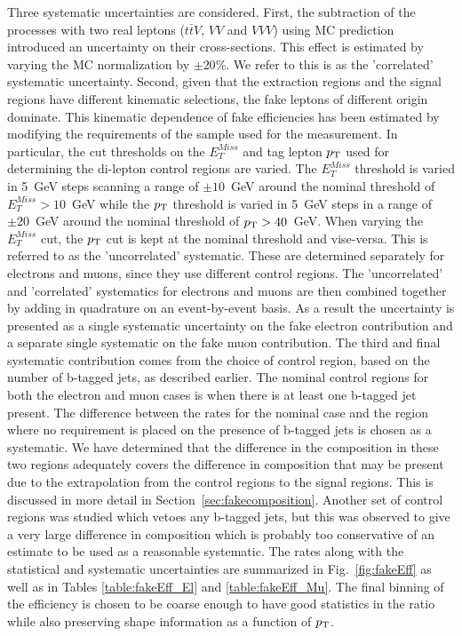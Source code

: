Three systematic uncertainties are considered. First, the subtraction of the processes with 
two real leptons ($t\bar{t}V$, $VV$ and $VVV$) using MC prediction introduced an uncertainty on 
their cross-sections. This effect is estimated by varying the MC normalization by $\pm 20$\%.  %
We refer to this is as the 'correlated' systematic uncertainty.
Second, given that the extraction regions and the signal regions have different kinematic selections, 
the fake leptons of different origin dominate. This kinematic dependence of fake efficiencies has been estimated 
by modifying the requirements of the sample used for the measurement. In particular, the cut thresholds 
on the $E_{T}^{Miss}$ and tag lepton $p_{\mathrm{T}}$ used
for determining the di-lepton control regions are varied. The $E_{T}^{Miss}$ threshold is 
varied in 5~GeV steps scanning a range of $\pm 10$~GeV around the nominal
threshold of $E_{T}^{Miss} > 10$~GeV while the $p_{\mathrm{T}}$ threshold is varied in 5~GeV steps in a range of $\pm 20$~GeV 
around the nominal threshold of $p_{\mathrm{T}} > 40$~GeV.  When varying the $E_{T}^{Miss}$ cut, the $p_{\mathrm{T}}$ cut
is kept at the nominal threshold and vise-versa. This is referred to as the 'uncorrelated' systematic.
These are determined separately for electrons and muons, since they use different control regions. The 'uncorrelated' and
'correlated' systematics for electrons and muons are then combined together by adding in quadrature on an event-by-event basis.
As a result the uncertainty is presented as a single systematic uncertainty on the fake electron
contribution and a separate single systematic on the fake muon contribution.
The third and final systematic contribution comes from the choice of control region, based on the number of b-tagged
jets, as described earlier.  The nominal control regions for both the electron and muon cases is when 
there is at least one b-tagged jet present.  The difference between the rates for the nominal case
and the region where no requirement is placed on the presence of b-tagged jets is chosen as a systematic.
We have determined that the difference in the composition in these two regions adequately covers the difference
in composition that may be present due to the extrapolation from the control regions to the signal regions. This is 
discussed in more detail in Section~\ref{sec:fakecomposition}.  Another set of control regions was studied
which vetoes any b-tagged jets, but this was observed to give a very large difference in composition which is 
probably too conservative of an estimate to be used as a reasonable systematic.
The rates along with the statistical and systematic uncertainties are summarized in Fig.~\ref{fig:fakeEff} 
as well as in Tables \ref{table:fakeEff_El} and \ref{table:fakeEff_Mu}.
The final binning of the efficiency is chosen to be coarse enough
to have good statistics in the ratio while also preserving shape information as a function
of $p_{\mathrm{T}}$. 


